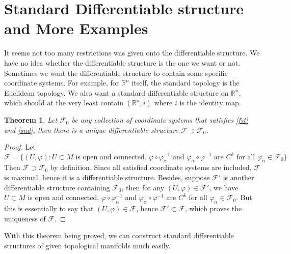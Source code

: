 \documentclass[twoside]{article}
\newtheorem{theorem}{Theorem}
\begin{document}
		\section{Standard Differentiable structure and More Examples}
		It seems not too many restrictions was given onto the differentiable structure. We have no idea whether the differentiable structure is the one we want or not. Sometimes we want the differentiable structure to contain some specific coordinate systems. For example, for $\mathbb{R}^n$ itself, the standard topology is the Euclidean topology. We also want a standard differentiable structure on $\mathbb{R}^n$, which should at the very least contain $(\mathbb{R}^n,i)$ where $i$ is the identity map.
		\begin{theorem}
			Let $\mathscr{F}_0$ be any collection of coordinate systems that satisfies \ref{fst} and \ref{snd}, then there is a unique differentiable structure $\mathscr{F} \supset \mathscr{F}_0$.
		\end{theorem}
		\begin{proof}
			Let
			\[
				\mathscr{F} = \{(U,\varphi):\text{$U\subset M$ is open and connected, $\varphi \circ \varphi_\alpha^{-1}$ and $\varphi_\alpha \circ \varphi^{-1}$ are $C^k$ for all $\varphi_\alpha \in \mathscr{F}_0$}\}
			\]
			Then $\mathscr{F} \supset \mathscr{F}_0$ by definition. Since all satisfied coordinate systems are included, $\mathscr{F}$ is maximal, hence it is a differentiable structure. Besides, suppose $\mathscr{F}'$ is another differentiable structure containing $\mathscr{F}_0$, then for any $(U,\varphi) \in \mathscr{F}'$, we have $U \subset M$ is open and connected, $\varphi \circ \varphi_\alpha^{-1}$ and $\varphi_\alpha \circ \varphi^{-1}$ are $C^k$ for all $\varphi_\alpha \in \mathscr{F}_0$. But this is essentially to say that $(U,\varphi) \in \mathscr{F}$, hence $\mathscr{F}' \subset \mathscr{F}$, which proves the uniqueness of $\mathscr{F}$.
		\end{proof}
		With this theorem being proved, we can construct standard differentiable structures of given topological manifolds much easily.
\end{document}
